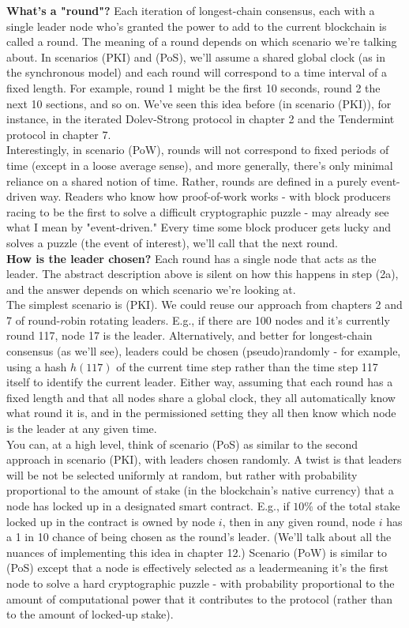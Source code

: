 \noindent
\textbf{What's a "round"?} Each iteration of longest-chain consensus, each with a single leader node who's granted the power to add to the current blockchain is called a round. The meaning of a round depends on which scenario we're talking about. In scenarios (PKI) and (PoS), we'll assume a shared global clock (as in the synchronous model) and each round will correspond to a time interval of a fixed length. For example, round 1 might be the first 10 seconds, round 2 the next 10 sections, and so on. We've seen this idea before (in scenario (PKI)), for instance, in the iterated Dolev-Strong protocol in chapter 2 and the Tendermint protocol in chapter 7.\\
Interestingly, in scenario (PoW), rounds will not correspond to fixed periods of time (except in a loose average sense), and more generally, there's only minimal reliance on a shared notion of time. Rather, rounds are defined in a purely event-driven way. Readers who know how proof-of-work works - with block producers racing to be the first to solve a difficult cryptographic puzzle - may already see what I mean by "event-driven." Every time some block producer gets lucky and solves a puzzle (the event of interest), we'll call that the next round.\\

\noindent
\textbf{How is the leader chosen?} Each round has a single node that acts as the leader. The abstract description above is silent on how this happens in step (2a), and the answer depends on which scenario we're looking at.\\
The simplest scenario is (PKI). We could reuse our approach from chapters 2 and 7 of round-$r$obin rotating leaders. E.g., if there are 100 nodes and it's currently round 117, node 17 is the leader. Alternatively, and better for longest-chain consensus (as we'll see), leaders could be chosen (pseudo)randomly - for example, using a hash $h(117)$ of the current time step rather than the time step 117 itself to identify the current leader. Either way, assuming that each round has a fixed length and that all nodes share a global clock, they all automatically know what round it is, and in the permissioned setting they all then know which node is the leader at any given time.\\
You can, at a high level, think of scenario (PoS) as similar to the second approach in scenario (PKI), with leaders chosen randomly. A twist is that leaders will be not be selected uniformly at random, but rather with probability proportional to the amount of stake (in the blockchain's native currency) that a node has locked up in a designated smart contract. E.g., if $10 \%$ of the total stake locked up in the contract is owned by node $i$, then in any given round, node $i$ has a 1 in 10 chance of being chosen as the round's leader. (We'll talk about all the nuances of implementing this idea in chapter 12.)
Scenario (PoW) is similar to (PoS) except that a node is effectively selected as a leadermeaning it's the first node to solve a hard cryptographic puzzle - with probability proportional to the amount of computational power that it contributes to the protocol (rather than to the amount of locked-up stake).\\

